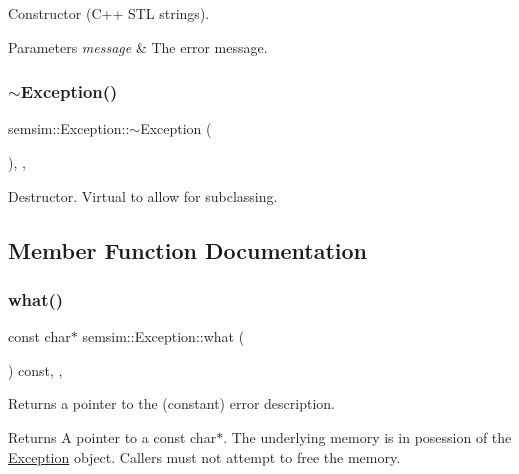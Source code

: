 Constructor (C++ S\+TL strings). 
\begin{DoxyParams}{Parameters}
{\em message} & The error message. \\
\hline
\end{DoxyParams}
\mbox{\label{classsemsim_1_1Exception_a3f2c9347cddce32086f53f360a7839ae}} 
\subsubsection{\texorpdfstring{$\sim$\+Exception()}{~Exception()}}
{\footnotesize\ttfamily semsim\+::\+Exception\+::$\sim$\+Exception (\begin{DoxyParamCaption}{ }\end{DoxyParamCaption})\hspace{0.3cm}{\ttfamily [override]}, {\ttfamily [default]}, {\ttfamily [noexcept]}}

Destructor. Virtual to allow for subclassing. 

\subsection{Member Function Documentation}
\mbox{\label{classsemsim_1_1Exception_a301e9f6c7020ce7218811f4c0683ee77}} 
\subsubsection{\texorpdfstring{what()}{what()}}
{\footnotesize\ttfamily const char$\ast$ semsim\+::\+Exception\+::what (\begin{DoxyParamCaption}{ }\end{DoxyParamCaption}) const\hspace{0.3cm}{\ttfamily [inline]}, {\ttfamily [override]}, {\ttfamily [noexcept]}}

Returns a pointer to the (constant) error description. \begin{DoxyReturn}{Returns}
A pointer to a const char$\ast$. The underlying memory is in posession of the \hyperlink{classsemsim_1_1Exception}{Exception} object. Callers must not attempt to free the memory. 
\end{DoxyReturn}


